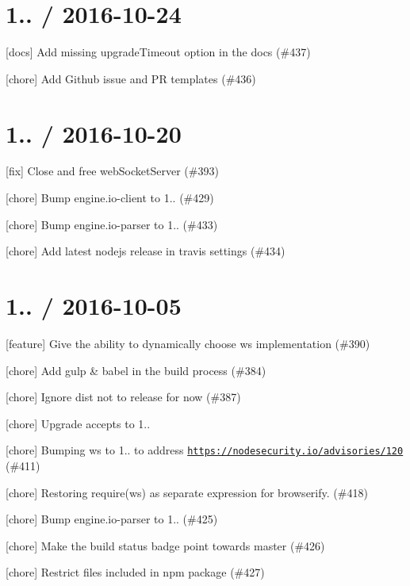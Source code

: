 \section*{1.. / 2016-\/10-\/24 }


\begin{DoxyItemize}
\item \mbox{[}docs\mbox{]} Add missing {\ttfamily upgrade\+Timeout} option in the docs (\#437)
\item \mbox{[}chore\mbox{]} Add Github issue and PR templates (\#436)
\end{DoxyItemize}

\section*{1.. / 2016-\/10-\/20 }


\begin{DoxyItemize}
\item \mbox{[}fix\mbox{]} Close and free web\+Socket\+Server (\#393)
\item \mbox{[}chore\mbox{]} Bump engine.\+io-\/client to 1.. (\#429)
\item \mbox{[}chore\mbox{]} Bump engine.\+io-\/parser to 1.. (\#433)
\item \mbox{[}chore\mbox{]} Add latest nodejs release in travis settings (\#434)
\end{DoxyItemize}

\section*{1.. / 2016-\/10-\/05 }


\begin{DoxyItemize}
\item \mbox{[}feature\mbox{]} Give the ability to dynamically choose ws implementation (\#390)
\item \mbox{[}chore\mbox{]} Add gulp \& babel in the build process (\#384)
\item \mbox{[}chore\mbox{]} Ignore dist not to release for now (\#387)
\item \mbox{[}chore\mbox{]} Upgrade accepts to 1..
\item \mbox{[}chore\mbox{]} Bumping ws to 1.. to address \href{https://nodesecurity.io/advisories/120}{\tt https\+://nodesecurity.\+io/advisories/120} (\#411)
\item \mbox{[}chore\mbox{]} Restoring require(\textquotesingle{}ws\textquotesingle{}) as separate expression for browserify. (\#418)
\item \mbox{[}chore\mbox{]} Bump engine.\+io-\/parser to 1.. (\#425)
\item \mbox{[}chore\mbox{]} Make the build status badge point towards master (\#426)
\item \mbox{[}chore\mbox{]} Restrict files included in npm package (\#427)
\end{DoxyItemize}

